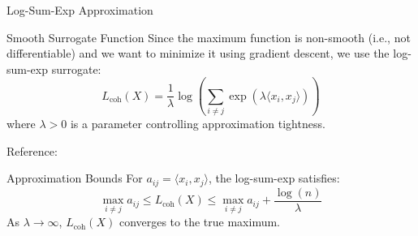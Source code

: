 \documentclass[9pt,dvipsnames]{beamer}
\begin{document}
\begin{frame}{Log-Sum-Exp Approximation}

	\begin{block}{Smooth Surrogate Function}
		Since the maximum function is non-smooth (i.e., not differentiable) and we want to minimize it using gradient descent, we use the log-sum-exp surrogate:
		\begin{equation*}
			L_{\text{coh}}(X) = \frac{1}{\lambda} \log\left( \sum_{i \neq j} \exp(\lambda \langle x_i, x_j \rangle) \right)
		\end{equation*}
		where $\lambda > 0$ is a parameter controlling approximation tightness.
	\end{block}

	Reference: \cite{wikipedia_logsumexp_2024}

	\begin{block}{Approximation Bounds}
		For $a_{ij} = \langle x_i, x_j \rangle$, the log-sum-exp satisfies:
		\begin{equation*}
			\max_{i \neq j} a_{ij} \leq L_{\text{coh}}(X) \leq \max_{i \neq j} a_{ij} + \frac{\log(n)}{\lambda}
		\end{equation*}
		As $\lambda \to \infty$, $L_{\text{coh}}(X)$ converges to the true maximum.
	\end{block}

\end{frame}
\end{document}

